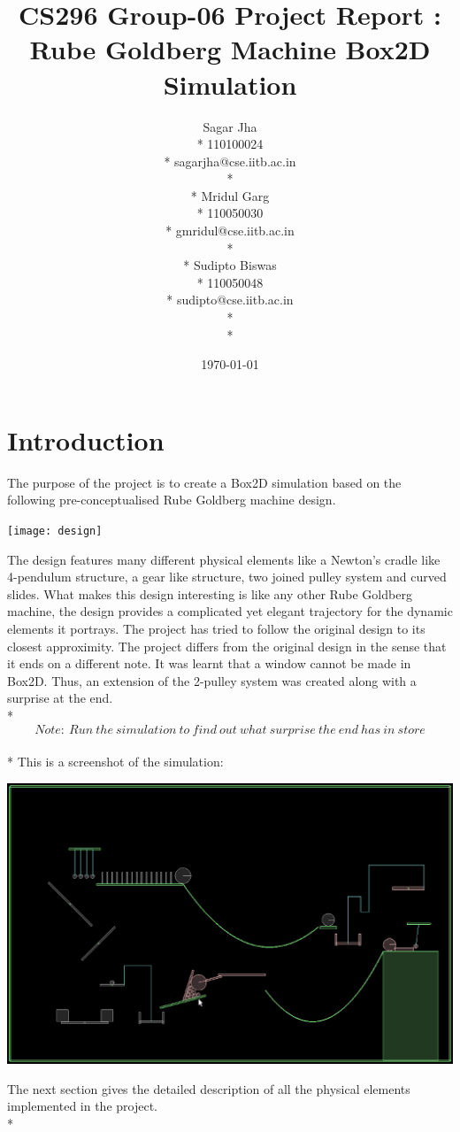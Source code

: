 \documentclass[11pt]{article}
\begin{document}
\title{CS296 Group-06 Project Report : Rube Goldberg Machine Box2D Simulation}
\author{ 
Sagar Jha\\*
110100024\\*
sagarjha@cse.iitb.ac.in\\*\\*
Mridul Garg\\*
110050030\\*
gmridul@cse.iitb.ac.in\\*\\*
Sudipto Biswas \\*
110050048\\*
sudipto@cse.iitb.ac.in\\*\\*
}
\date{\today}
\maketitle

\section{Introduction}
The purpose of the project is to create a Box2D simulation based on the following pre-conceptualised Rube Goldberg machine design\cite{rube_g}.
\begin{center}
\texttt{[image: design]}
\end{center}
The design features many different physical elements like a Newton's cradle like 4-pendulum structure, a gear like structure, two joined pulley system and curved slides. What makes this design interesting is like any other Rube Goldberg machine, the design provides a complicated yet elegant trajectory for the dynamic elements it portrays. The project has tried to follow the original design to its closest approximity. The project differs from the original design in the sense that it ends on a different note. It was learnt that a window cannot be made in Box2D. Thus, an extension of the 2-pulley system was created along with a surprise at the end. \\*
\[Note:\ Run\ the\ simulation\ to\ find\ out\ what\ surprise\ the\ end\ has\ in\ store\]\\* This is a screenshot of the simulation:  
\begin{center}
\includegraphics[scale=0.5]{sim}
\end{center}
The next section gives the detailed description of all the physical elements implemented in the project.\\* 
\end{document}
